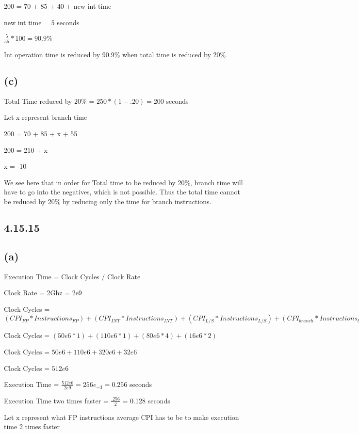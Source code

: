\documentclass{article}
\begin{document}
    200 = 70 + 85 + 40 + new int time

    new int time = 5 seconds

    $\frac{5}{55} * 100 = 90.9\%$

    Int operation time is reduced by 90.9\% when total time is reduced by 20\%

    \subsection*{(c)}

    Total Time reduced by 20\% = $250 * (1-.20) = 200$ seconds

    Let x represent branch time

    200 = 70 + 85 + x + 55

    200 = 210 + x

    x = -10

    We see here that in order for Total time to be reduced by 20\%, branch time will have to go into the negatives, which is not possible. Thus the total time cannot be reduced by 20\% by reducing only the time for branch instructions.

    \subsection*{4.15.15}

    \subsection*{(a)}

    Execution Time = Clock Cycles / Clock Rate

    Clock Rate = 2Ghz = 2e9

    Clock Cycles = $(CPI_{FP} * Instructions_{FP}) + (CPI_{INT} * Instructions_{INT}) + (CPI_{L/S} * Instructions_{L/S}) + (CPI_{branch}* Instructions_{branch})$

    Clock Cycles = $(50e6 * 1) + (110e6 * 1) + (80e6 * 4) + (16e6 * 2)$

    Clock Cycles = $50e6 + 110e6 + 320e6 + 32e6$

    Clock Cycles = $512e6$

    Execution Time = $\frac{512e6}{2e9} = 256e_{-3} = 0.256$ seconds

    Execution Time two times faster = $\frac{.256}{2}$ = 0.128 seconds

    Let x represent what FP instructions average CPI has to be to make execution time 2 times faster
\end{document}
